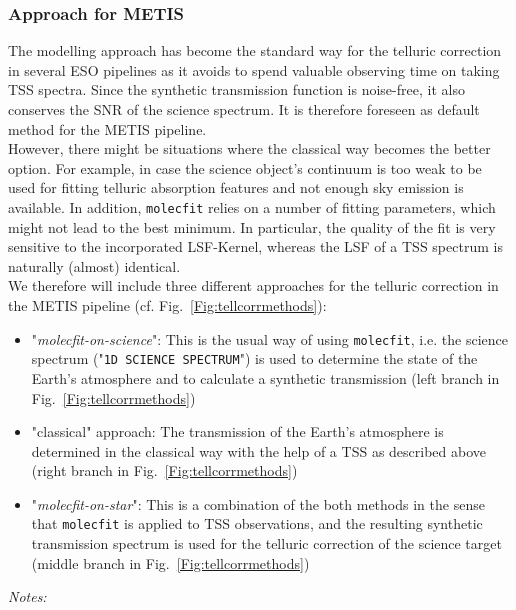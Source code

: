 \subsubsection{Approach for METIS}
The modelling approach has become the standard way for the telluric correction in several ESO pipelines as it avoids to spend valuable observing time on taking \ac{TSS} spectra. Since the synthetic transmission function is noise-free, it also conserves the \ac{SNR} of the science spectrum. It is therefore  foreseen as default method for the \ac{METIS} pipeline.\\
However, there might be situations where the classical way becomes the better option. For example, in case the science object's continuum is too weak to be used for fitting telluric absorption features and not enough sky emission is available. In addition, \texttt{molecfit} relies on a number of fitting parameters, which might not lead to the best minimum. In particular, the quality of the fit is very sensitive to the incorporated \ac{LSF}-Kernel, whereas the \ac{LSF} of a \ac{TSS} spectrum is naturally (almost) identical.\\
We therefore will include three different approaches for the telluric correction in the \ac{METIS} pipeline (cf. Fig.~\ref{Fig:tellcorrmethods}):
\begin{itemize}
    \item "\textit{molecfit-on-science}": This is the usual way of using \texttt{molecfit}, i.e. the science spectrum ("\texttt{1D SCIENCE SPECTRUM}") is used to determine the state of the Earth's atmosphere and to calculate a synthetic transmission (left branch in Fig.~\ref{Fig:tellcorrmethods})
    \item "classical" approach: The transmission of the Earth's atmosphere is determined in the classical way with the help of a \ac{TSS} as described above (right branch in Fig.~\ref{Fig:tellcorrmethods})
    \item "\textit{molecfit-on-star}": This is a combination of the both methods in the sense that \texttt{molecfit} is applied to \ac{TSS} observations, and the resulting synthetic transmission spectrum is used for the telluric correction of the science target  (middle branch in Fig.~\ref{Fig:tellcorrmethods})
\end{itemize}
\textit{Notes:}\\
